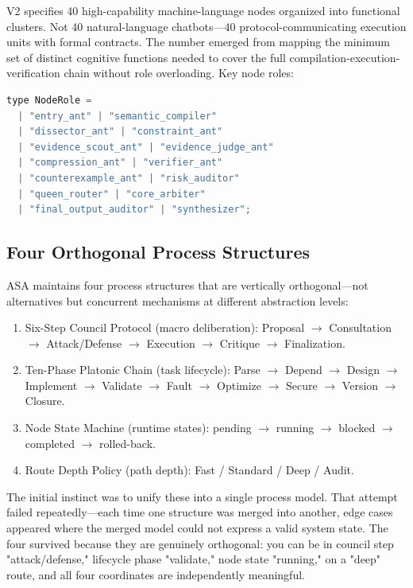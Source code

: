 \documentclass[12pt,a4paper]{article}
\begin{document}
V2 specifies 40 high-capability machine-language nodes organized into functional clusters. Not 40 natural-language chatbots---40 protocol-communicating execution units with formal contracts. The number emerged from mapping the minimum set of distinct cognitive functions needed to cover the full compilation-execution-verification chain without role overloading. Key node roles:

\begin{lstlisting}[language=JavaScript]
type NodeRole =
  | "entry_ant" | "semantic_compiler"
  | "dissector_ant" | "constraint_ant"
  | "evidence_scout_ant" | "evidence_judge_ant"
  | "compression_ant" | "verifier_ant"
  | "counterexample_ant" | "risk_auditor"
  | "queen_router" | "core_arbiter"
  | "final_output_auditor" | "synthesizer";
\end{lstlisting}


\subsection{Four Orthogonal Process Structures}


ASA maintains four process structures that are vertically orthogonal---not alternatives but concurrent mechanisms at different abstraction levels:

\begin{enumerate}
  \item Six-Step Council Protocol (macro deliberation): Proposal $\rightarrow$ Consultation $\rightarrow$ Attack/Defense $\rightarrow$ Execution $\rightarrow$ Critique $\rightarrow$ Finalization.
  \item Ten-Phase Platonic Chain (task lifecycle): Parse $\rightarrow$ Depend $\rightarrow$ Design $\rightarrow$ Implement $\rightarrow$ Validate $\rightarrow$ Fault $\rightarrow$ Optimize $\rightarrow$ Secure $\rightarrow$ Version $\rightarrow$ Closure.
  \item Node State Machine (runtime states): pending $\rightarrow$ running $\rightarrow$ blocked $\rightarrow$ completed $\rightarrow$ rolled-back.
  \item Route Depth Policy (path depth): Fast / Standard / Deep / Audit.
\end{enumerate}

The initial instinct was to unify these into a single process model. That attempt failed repeatedly---each time one structure was merged into another, edge cases appeared where the merged model could not express a valid system state. The four survived because they are genuinely orthogonal: you can be in council step "attack/defense," lifecycle phase "validate," node state "running," on a "deep" route, and all four coordinates are independently meaningful.
\end{document}
